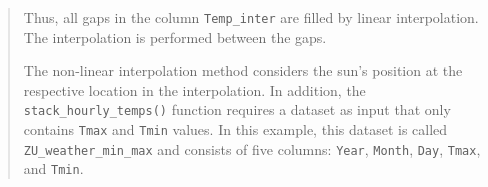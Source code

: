 \documentclass[
]{book}
\newenvironment{Shaded}{\begin{snugshade}}{\end{snugshade}}
\newcommand{\CommentTok}[1]{\textcolor[rgb]{0.56,0.35,0.01}{\textit{#1}}}
\newcommand{\DataTypeTok}[1]{\textcolor[rgb]{0.13,0.29,0.53}{#1}}
\newcommand{\DecValTok}[1]{\textcolor[rgb]{0.00,0.00,0.81}{#1}}
\newcommand{\KeywordTok}[1]{\textcolor[rgb]{0.13,0.29,0.53}{\textbf{#1}}}
\newcommand{\NormalTok}[1]{#1}
\newcommand{\OperatorTok}[1]{\textcolor[rgb]{0.81,0.36,0.00}{\textbf{#1}}}
\newcommand{\StringTok}[1]{\textcolor[rgb]{0.31,0.60,0.02}{#1}}
\begin{document}
\begin{quote}
Thus, all gaps in the column \texttt{Temp\_inter} are filled by linear interpolation. The interpolation is performed between the gaps.

The non-linear interpolation method considers the sun's position at the respective location in the interpolation. In addition, the \texttt{stack\_hourly\_temps()} function requires a dataset as input that only contains \texttt{Tmax} and \texttt{Tmin} values. In this example, this dataset is called \texttt{ZU\_weather\_min\_max} and consists of five columns: \texttt{Year}, \texttt{Month}, \texttt{Day}, \texttt{Tmax}, and \texttt{Tmin}.
\end{quote}

\begin{Shaded}
\end{Shaded}

\begingroup\fontsize{10}{12}\selectfont
\end{document}

